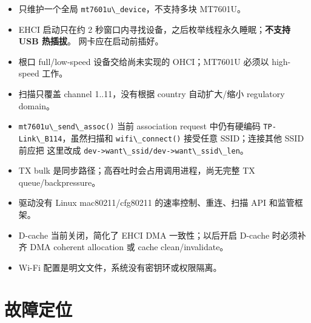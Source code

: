 \begin{itemize}
\tightlist
\item
  只维护一个全局 \passthrough{\lstinline!mt7601u\_device!}，不支持多块
  MT7601U。
\item
  EHCI 启动只在约 2
  秒窗口内寻找设备，之后枚举线程永久睡眠；\textbf{不支持 USB 热插拔}。
  网卡应在启动前插好。
\item
  根口 full/low-speed 设备交给尚未实现的 OHCI；MT7601U 必须以 high-speed
  工作。
\item
  扫描只覆盖 channel 1..11，没有根据 country 自动扩大/缩小 regulatory
  domain。
\item
  \passthrough{\lstinline!mt7601u\_send\_assoc()!} 当前 association
  request 中仍有硬编码
  \passthrough{\lstinline!TP-Link\_B114!}，虽然扫描和
  \passthrough{\lstinline!wifi\_connect()!} 接受任意 SSID；连接其他 SSID
  前应把 这里改成
  \passthrough{\lstinline!dev->want\_ssid/dev->want\_ssid\_len!}。
\item
  TX bulk 是同步路径；高吞吐时会占用调用进程，尚无完整 TX
  queue/backpressure。
\item
  驱动没有 Linux mac80211/cfg80211 的速率控制、重连、扫描 API
  和监管框架。
\item
  D-cache 当前关闭，简化了 EHCI DMA 一致性；以后开启 D-cache 时必须补齐
  DMA coherent allocation 或 cache clean/invalidate。
\item
  Wi-Fi 配置是明文文件，系统没有密钥环或权限隔离。
\end{itemize}

\section{故障定位}\label{ux6545ux969cux5b9aux4f4d}


